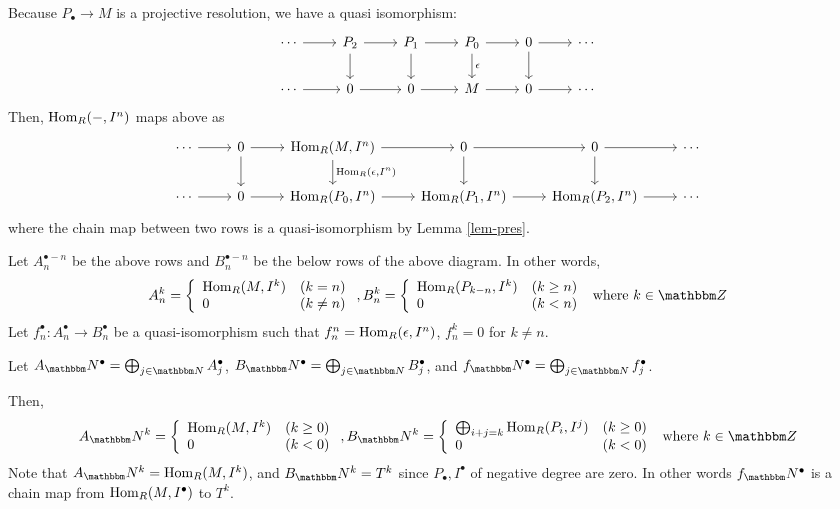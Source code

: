 Because \(P_\bullet \to M\) is a projective resolution,
we have a quasi isomorphism:
\[\begin{tikzcd}
  \cdots \ar{r} & P_2 \ar{d} \ar{r} & P_1 \ar{d} \ar{r} & P_0 \ar["\epsilon"]{d} \ar{r} & 0 \ar{d} \ar{r} & \cdots \\
  \cdots \ar{r} & 0 \ar{r} & 0 \ar{r} & M \ar{r} & 0 \ar{r} & \cdots
\end{tikzcd}\]
Then, \(\textnormal{Hom}_R(-, I^n)\) maps above as
\[\begin{tikzcd}
  \cdots \ar{r} & 0 \ar{d} \ar{r} & \Hom_R(M, I^n) \ar["\Hom_R(\epsilon{,}I^n)"]{d} \ar{r} & 0 \ar{d} \ar{r} & 0 \ar{d} \ar{r} & \cdots \\
  \cdots \ar{r} & 0 \ar{r} & \Hom_R(P_0, I^n) \ar{r} & \Hom_R(P_1, I^n) \ar{r} & \Hom_R(P_2, I^n) \ar{r} & \cdots
\end{tikzcd}\]
where the chain map between two rows is a quasi-isomorphism by Lemma \ref{lem-pres}.

Let \(A_n^{\bullet - n}\) be the above rows and \(B_n^{\bullet - n}\) be the below rows of the above diagram.
In other words,
\[A_n^k = \left\{\begin{array}{ll}
\Hom_R(M, I^k) & (k = n) \\
0 & (k \neq n) \\
\end{array}\right.
,
B_n^k = \left\{\begin{array}{ll}
\Hom_R(P_{k - n}, I^k) & (k \ge n) \\
0 & (k < n) \\
\end{array}\right.
\text{ where }
k \in \bbZ
\]
Let \(f_n^\bullet: A_n^\bullet \to B_n^\bullet\) be a quasi-isomorphism
such that
\(f_n^n = \textnormal{Hom}_R(\epsilon, I^n)\), \(f_n^k = 0\) for \(k \neq n\).

Let
\(A_\bbN^\bullet = \bigoplus_{j\in\bbN} A_j^\bullet\),
\(B_\bbN^\bullet = \bigoplus_{j\in\bbN} B_j^\bullet\),
and
\(f_\bbN^\bullet = \bigoplus_{j\in\bbN} f_j^\bullet\).

Then,
\[A_\bbN^k = \left\{\begin{array}{ll}
\Hom_R(M, I^k) & (k \ge 0) \\
0 & (k < 0) \\
\end{array}\right.
,
B_\bbN^k = \left\{\begin{array}{ll}
\bigoplus_{i+j=k} \Hom_R(P_i, I^j) & (k \ge 0) \\
0 & (k < 0) \\
\end{array}\right.
\text{ where }
k \in \bbZ
\]
Note that
\(A_\bbN^k = \Hom_R(M, I^k)\),
and
\(B_\bbN^k = T^k\) since \(P_\bullet, I^\bullet\) of negative degree are zero.
In other words \(f_\bbN^\bullet\) is a chain map
from \(\textnormal{Hom}_R(M, I^\bullet)\)
to \(T^k\).

